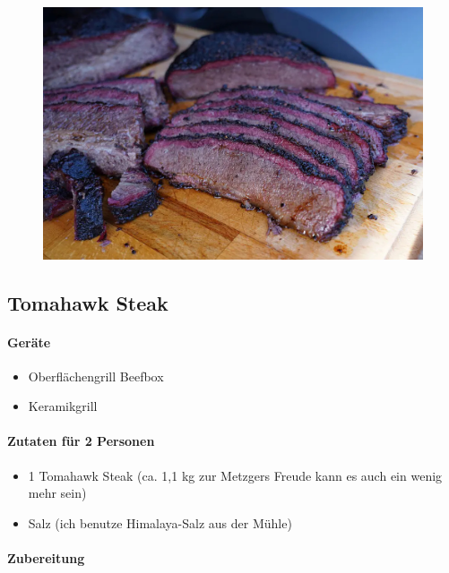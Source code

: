 \begin{figure}[htbp]
	\centering
	\begin{minipage}{1\textwidth}
		\centering
		\includegraphics[width=.9\linewidth]{pics/Brisket}
		\label{fig:Brisket}
	\end{minipage}
\end{figure}
\newpage

\subsection{Tomahawk Steak}

\paragraph{Geräte}

\begin{itemize}[noitemsep]
	\item Oberflächengrill Beefbox
	\item Keramikgrill
\end{itemize}

\paragraph{Zutaten für 2 Personen}

\begin{itemize}[noitemsep]
	\item 1 Tomahawk Steak (ca. 1,1 kg zur Metzgers Freude kann es auch ein 
	wenig mehr sein)
	\item Salz (ich benutze Himalaya-Salz aus der Mühle)
\end{itemize}

\paragraph{Zubereitung}

